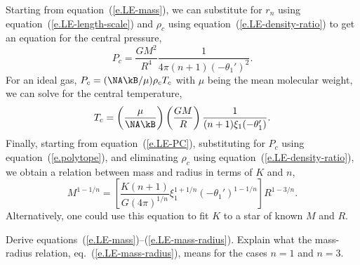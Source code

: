 Starting from equation~(\ref{e.LE-mass}), we can substitute for $r_{n}$ using equation~(\ref{e.LE-length-scale}) and $\rho_{c}$ using equation~(\ref{e.LE-density-ratio}) to get an equation for the central pressure,
\begin{equation}\label{e.LE-PC}
P_{c} = \frac{GM^{2}}{R^{4}} \frac{1}{4\pi(n+1)(-\theta_{1}')^{2}}.
\end{equation}
For an ideal gas, $P_{c} = (\NA\kB/\mu)\rho_{c}T_{c}$ with $\mu$ being the mean molecular weight, we can solve for the central temperature,
\begin{equation}\label{e.LE-TC}
T_{c} = \left(\frac{\mu}{\NA\kB}\right)\left(\frac{GM}{R}\right)\frac{1}{(n+1)\xi_{1}(-\theta_{1}')}.
\end{equation}
Finally, starting from equation~(\ref{e.LE-PC}), substituting for $P_{c}$ using equation~(\ref{e.polytope}), and eliminating $\rho_{c}$ using equation~(\ref{e.LE-density-ratio}), we obtain a relation between mass and radius in terms of $K$ and $n$,
\begin{equation}\label{e.LE-mass-radius}
M^{1-1/n} = \left[\frac{K(n+1)}{G(4\pi)^{1/n}} \xi_{1}^{1+1/n}\left(-\theta_{1}'\right)^{1-1/n} \right] R^{1-3/n}.
\end{equation}
Alternatively, one could use this equation to fit $K$ to a star of known $M$ and $R$.

\begin{exercisebox}
Derive equations~(\ref{e.LE-mass})--(\ref{e.LE-mass-radius}). Explain what the mass-radius relation, eq.~(\ref{e.LE-mass-radius}), means for the cases $n=1$ and $n=3$.
\end{exercisebox}

